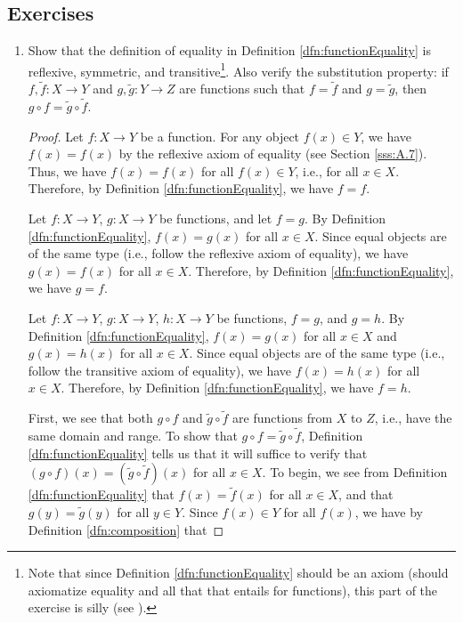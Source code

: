 \documentclass[../main.tex]{subfiles}
\begin{document}
\subsection*{Exercises}
\begin{enumerate}[ref={\thesection.\arabic*}]
    \item \label{exr:3.3.1}Show that the definition of equality in Definition \ref{dfn:functionEquality} is reflexive, symmetric, and transitive\footnote{Note that since Definition \ref{dfn:functionEquality} should be an axiom (should axiomatize equality and all that that entails for functions), this part of the exercise is silly (see \cite{bib:TaoErrata}).}. Also verify the substitution property: if $f,\tilde{f}:X\to Y$ and $g,\tilde{g}:Y\to Z$ are functions such that $f=\tilde{f}$ and $g=\tilde{g}$, then $g\circ f=\tilde{g}\circ\tilde{f}$.
    \begin{proof}
        Let $f:X\to Y$ be a function. For any object $f(x)\in Y$, we have $f(x)=f(x)$ by the reflexive axiom of equality (see Section \ref{sss:A.7}). Thus, we have $f(x)=f(x)$ for all $f(x)\in Y$, i.e., for all $x\in X$. Therefore, by Definition \ref{dfn:functionEquality}, we have $f=f$.\par
        Let $f:X\to Y$, $g:X\to Y$ be functions, and let $f=g$. By Definition \ref{dfn:functionEquality}, $f(x)=g(x)$ for all $x\in X$. Since equal objects are of the same type (i.e., follow the reflexive axiom of equality), we have $g(x)=f(x)$ for all $x\in X$. Therefore, by Definition \ref{dfn:functionEquality}, we have $g=f$.\par
        Let $f:X\to Y$, $g:X\to Y$, $h:X\to Y$ be functions, $f=g$, and $g=h$. By Definition \ref{dfn:functionEquality}, $f(x)=g(x)$ for all $x\in X$ and $g(x)=h(x)$ for all $x\in X$. Since equal objects are of the same type (i.e., follow the transitive axiom of equality), we have $f(x)=h(x)$ for all $x\in X$. Therefore, by Definition \ref{dfn:functionEquality}, we have $f=h$.\par
        First, we see that both $g\circ f$ and $\tilde{g}\circ\tilde{f}$ are functions from $X$ to $Z$, i.e., have the same domain and range. To show that $g\circ f=\tilde{g}\circ\tilde{f}$, Definition \ref{dfn:functionEquality} tells us that it will suffice to verify that $(g\circ f)(x)=(\tilde{g}\circ\tilde{f})(x)$ for all $x\in X$. To begin, we see from Definition \ref{dfn:functionEquality} that $f(x)=\tilde{f}(x)$ for all $x\in X$, and that $g(y)=\tilde{g}(y)$ for all $y\in Y$. Since $f(x)\in Y$ for all $f(x)$, we have by Definition \ref{dfn:composition} that

\end{proof}
\end{enumerate}
\end{document}
